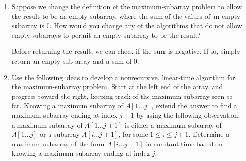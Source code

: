 \documentclass[Chapter04]{subfiles}
\begin{document}
\begin{enumerate}
\begin{answer}
		\end{answer}

		\item Suppose we change the definition of the maximum-subarray problem to allow the result to be an empty subarray, where the sum of the values of an empty subarray is $0$. How would you change any of the algorithms that do not allow empty subarrays to permit an empty subarray to be the result?
		\begin{answer}
			Before returning the result, we can check if the sum is negative. If so, simply return an empty sub-array and a sum of 0.
		\end{answer}

		\item Use the following ideas to develop a nonrecursive, linear-time algorithm for the maximum-subarray problem. Start at the left end of the array, and progress toward the right, keeping track of the maximum subarray seen so far. Knowing a maximum subarray of $A[1 \dots j]$, extend the answer to find a maximum subarray ending at index $j + 1$ by using the following observation: a maximum subarray of $A[1 \dots j + 1]$ is either a maximum subarray of $A[1 \dots j]$ or a subarray $A[i \dots j + 1]$, for some $1 \leq i \leq j + 1$. Determine a maximum subarray of the form $A[i \dots j + 1]$ in constant time based on knowing a maximum subarray ending at index $j$.
		\begin{answer}
			
		\end{answer}

	\end{enumerate}
\end{document}
